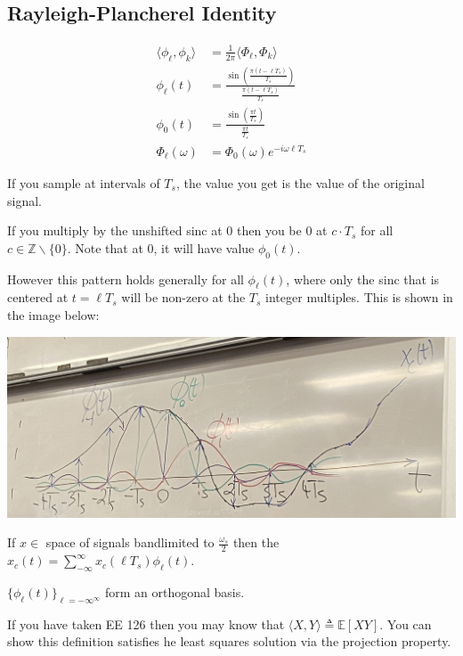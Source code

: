 \subsection{Rayleigh-Plancherel Identity}
\begin{align*}
    \langle \phi_\ell, \phi_k \rangle
    &=
    \frac{1}{2\pi} \langle \Phi_\ell, \Phi_k \rangle
    \\
    \phi_\ell(t) 
    &= \frac{\sin\left(\frac{\pi(t-\ell T_s)}{T_s}\right)}{\frac{\pi(t-\ell T_s)}{T_s}}
    \\
    \phi_0(t) 
    &= \frac{\sin\left(\frac{\pi t}{T_s}\right)}{\frac{\pi t}{T_s}}
    \\
    \Phi_\mathbf{\ell}(\omega)
    &=
    \Phi_0(\omega) e^{-i\omega \mathbf{\ell} T_s}
\end{align*}

If you sample at intervals of $T_s$, the value you get is the value of the original signal.

If you multiply by the unshifted sinc at 0 then you be 0 at $c\cdot T_s$ for all $c\in\mathbb Z \backslash \{0\}$. Note that at $0$, it will have value $\phi_0(t)$.

However this pattern holds generally for all $\phi_\ell(t)$, where only the sinc that is centered at $t=\ell T_s$ will be non-zero at the $T_s$ integer multiples. This is shown in the image below:
\begin{center}
    \includegraphics[scale=0.115]{lectures/wk11/img/sinc.jpg}
\end{center}

If $x\in$ space of signals bandlimited to $\frac{\omega_s}{2}$ then the $x_c(t) = \displaystyle\sum_{-\infty}^\infty x_c(\ell T_s)\phi_\ell(t)$.

$\{\phi_\ell(t)\}_{\ell=-\infty^\infty}$ form an orthogonal basis.

If you have taken EE 126 then you may know that $\langle X, Y\rangle \triangleq \mathbb E[XY]$. You can show this definition satisfies he least squares solution via the projection property.

